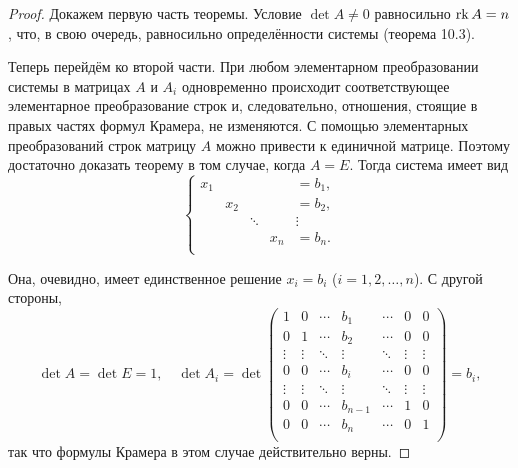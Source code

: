 \begin{proof}
    Докажем первую часть теоремы. Условие $\det A \ne 0$ равносильно $\mathrm{rk}\, A = n$, что, в свою очередь, равносильно определённости системы (теорема 10.3).

    Теперь перейдём ко второй части. При любом элементарном преобразовании системы в матрицах $A$ и $A_i$ одновременно происходит соответствующее элементарное преобразование строк и, следовательно, отношения, стоящие в правых частях формул Крамера, не изменяются. С помощью элементарных преобразований строк матрицу $A$ можно привести к единичной матрице. Поэтому достаточно доказать теорему в том случае, когда $A = E$. Тогда система имеет вид
    $$
    \left\{
        \begin{array}{ccccc}
            x_1 & {} & {} & {} & =b_1,\\
            {} & x_2 & {} & {} & =b_2,\\
            {} & {} & \ddots & {} & \vdots\\
            {} & {} & {} & x_n & =b_n.\\
        \end{array}
    \right.
    $$
    
    Она, очевидно, имеет единственное решение $x_i = b_i$ ($i = 1, 2, \ldots, n$). С другой стороны,
    $$
    \det A = \det E = 1,\quad \det A_i =
    \det
    \begin{pmatrix}
        1 & 0 & \cdots & b_1 & \cdots & 0 & 0\\
        0 & 1 & \cdots & b_2 & \cdots & 0 & 0\\
        \vdots & \vdots & \ddots & \vdots & \ddots & \vdots & \vdots\\
        0 & 0 & \cdots & b_i & \cdots & 0 & 0\\
        \vdots & \vdots & \ddots & \vdots & \ddots & \vdots & \vdots\\
        0 & 0 & \cdots & b_{n - 1} & \cdots & 1 & 0\\
        0 & 0 & \cdots & b_n & \cdots & 0 & 1\\
    \end{pmatrix} = b_i,
    $$
    так что формулы Крамера в этом случае действительно верны.
\end{proof}


